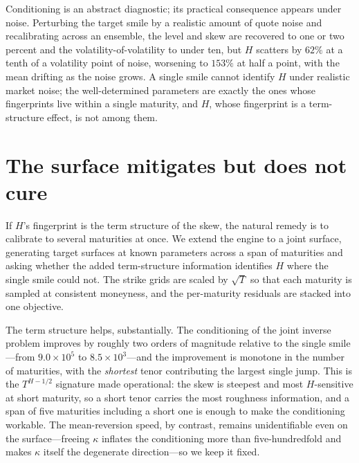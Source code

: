 \documentclass[11pt,a4paper]{article}
\numberwithin{equation}{section}
\begin{document}
Conditioning is an abstract diagnostic; its practical consequence appears under noise. Perturbing
the target smile by a realistic amount of quote noise and recalibrating across an ensemble, the
level and skew are recovered to one or two percent and the volatility-of-volatility to under ten,
but $H$ scatters by $62\%$ at a tenth of a volatility point of noise, worsening to $153\%$ at half
a point, with the mean drifting as the noise grows. A single smile cannot identify $H$ under
realistic market noise; the well-determined parameters are exactly the ones whose fingerprints
live within a single maturity, and $H$, whose fingerprint is a term-structure effect, is not
among them.

\section{The surface mitigates but does not cure}\label{sec:surface}

If $H$'s fingerprint is the term structure of the skew, the natural remedy is to calibrate to
several maturities at once. We extend the engine to a joint surface, generating target surfaces
at known parameters across a span of maturities and asking whether the added term-structure
information identifies $H$ where the single smile could not. The strike grids are scaled by
$\sqrt{T}$ so that each maturity is sampled at consistent moneyness, and the per-maturity residuals
are stacked into one objective.

The term structure helps, substantially. The conditioning of the joint inverse problem improves by
roughly two orders of magnitude relative to the single smile---from $9.0\times 10^{5}$ to
$8.5\times 10^{3}$---and the improvement is monotone in the number of maturities, with the
\emph{shortest} tenor contributing the largest single jump. This is the $T^{H-1/2}$ signature made
operational: the skew is steepest and most $H$-sensitive at short maturity, so a short tenor carries
the most roughness information, and a span of five maturities including a short one is enough to make
the conditioning workable. The mean-reversion speed, by contrast, remains unidentifiable even on the
surface---freeing $\kappa$ inflates the conditioning more than five-hundredfold and makes $\kappa$
itself the degenerate direction---so we keep it fixed.
\end{document}
